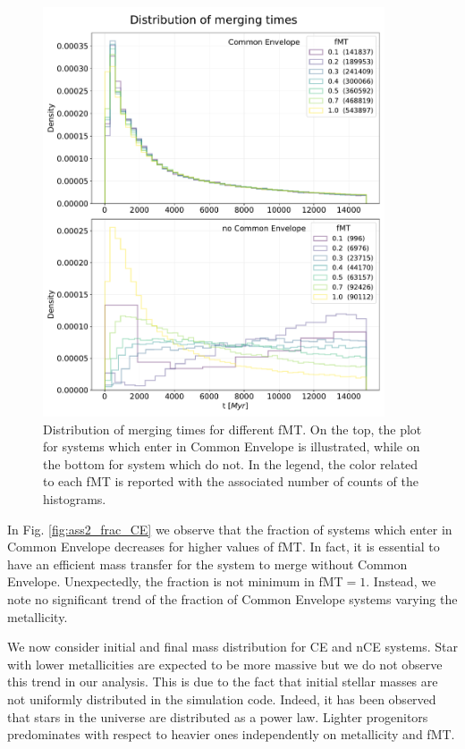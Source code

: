 \documentclass[prb,twocolumn,9pt]{revtex4-1}
\begin{document}
\begin{figure}[hbp]
    \begin{minipage}[c]{1.0\columnwidth}
    \centering
    \includegraphics[width=0.9\textwidth]{images/assignment2_1/hist_dtimes_fMT.pdf}
    \caption{Distribution of merging times for different fMT. On the top, the plot for systems which enter in Common Envelope is illustrated, while on the bottom for system which do not.
    In the legend, the color related to each  fMT is reported  with the associated number of counts of the histograms. }
    \label{fig:ass2_1_tmerg}
    \end{minipage}
\end{figure}


In Fig. \ref{fig:ass2_frac_CE} we observe that the fraction of systems which enter in Common Envelope decreases for higher values of fMT. In fact, it is essential to have an efficient mass transfer for the system to merge without Common Envelope. Unexpectedly, the fraction is not minimum in fMT\(=1\). Instead, we note no significant trend of the fraction of Common Envelope systems varying the metallicity.

We now consider initial and final mass distribution for CE and nCE systems. 
Star with lower metallicities are expected to be more massive but we do not observe this trend in our analysis. This is due to the fact that initial stellar masses are not uniformly distributed in the simulation code. Indeed, it has been observed that stars in the universe are distributed as a power law. Lighter progenitors predominates with respect to heavier ones independently on metallicity and fMT.
\end{document}
